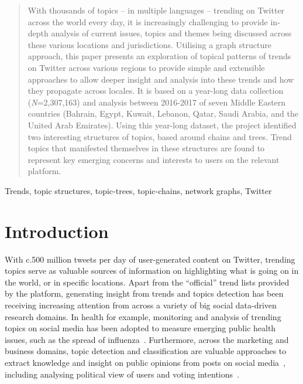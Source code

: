 \documentclass[conference]{IEEEtran}
\begin{document}
\begin{abstract}
With thousands of topics -- in multiple languages -- trending on
Twitter across the world every day, it is increasingly challenging to
provide in-depth analysis of current issues, topics and themes being
discussed across these various locations and jurisdictions. Utilising
a graph structure approach, this paper presents an exploration of
topical patterns of trends on Twitter across various regions to
provide simple and extensible approaches to allow deeper insight and
analysis into these trends and how they propagate across locales. It
is based on a year-long data collection ({\emph{N}}=2,307,163) and
analysis between 2016-2017 of seven Middle Eastern countries (Bahrain,
Egypt, Kuwait, Lebanon, Qatar, Saudi Arabia, and the United Arab
Emirates). Using this year-long dataset, the project identified two
interesting structures of topics, based around chains and trees. Trend
topics that manifested themselves in these structures are found to
represent key emerging concerns and interests to users on the relevant
platform.
\end{abstract}

\begin{IEEEkeywords}
Trends, topic structures, topic-trees, topic-chains, network graphs, Twitter
\end{IEEEkeywords}


\section{Introduction}\label{intro}

With c.500 million tweets per day of user-generated content on
Twitter, trending topics serve as valuable sources of information on
highlighting what is going on in the world, or in specific
locations. Apart from the ``official'' trend lists provided by the
platform, generating insight from trends and topics detection has been
receiving increasing attention from across a variety of big social
data-driven research domains. In health for example, monitoring and
analysis of trending topics on social media has been adopted to
measure emerging public health issues, such as the spread of
influenza~\cite{Achrekar2011,Parker2015}. Furthermore, across the
marketing and business domains, topic detection and classification are
valuable approaches to extract knowledge and insight on public
opinions from posts on social
media~\cite{blamey-et-al-2012,blamey-et-al-2013,Bello2013,mostafa-et-al-ai2016,albishry-et-al:ssei2018},
including analysing political view of users and voting
intentions~\cite{Fang2015}.
\end{document}
